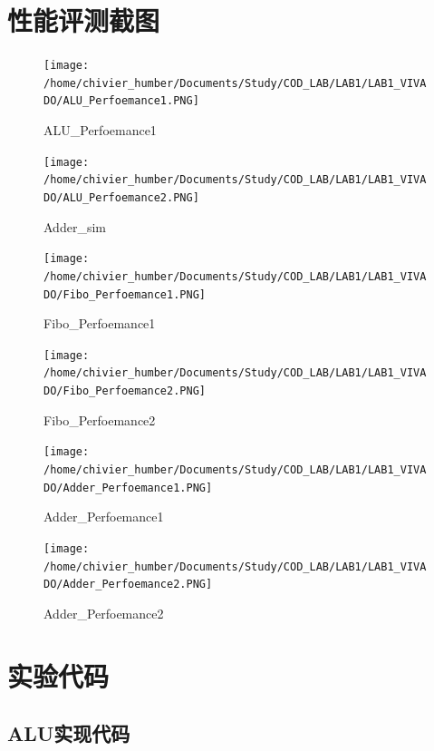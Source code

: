 \documentclass[12pt, a4paper]{article}
\begin{document}
\section{性能评测截图}
\begin{figure}[H]
	\centering
	\texttt{[image: /home/chivier\_humber/Documents/Study/COD\_LAB/LAB1/LAB1\_VIVADO/ALU\_Perfoemance1.PNG]}
	\caption{ALU\_Perfoemance1}
	\label{fig:lab1alusim}
\end{figure}
\begin{figure}[H]
	\centering
	\texttt{[image: /home/chivier\_humber/Documents/Study/COD\_LAB/LAB1/LAB1\_VIVADO/ALU\_Perfoemance2.PNG]}
	\caption{Adder\_sim}
	\label{fig:lab1alusim}
\end{figure}
\begin{figure}[H]
	\centering
	\texttt{[image: /home/chivier\_humber/Documents/Study/COD\_LAB/LAB1/LAB1\_VIVADO/Fibo\_Perfoemance1.PNG]}
	\caption{Fibo\_Perfoemance1}
	\label{fig:lab1alusim}
\end{figure}
\begin{figure}[H]
	\centering
	\texttt{[image: /home/chivier\_humber/Documents/Study/COD\_LAB/LAB1/LAB1\_VIVADO/Fibo\_Perfoemance2.PNG]}
	\caption{Fibo\_Perfoemance2}
	\label{fig:lab1alusim}
\end{figure}
\begin{figure}[H]
	\centering
	\texttt{[image: /home/chivier\_humber/Documents/Study/COD\_LAB/LAB1/LAB1\_VIVADO/Adder\_Perfoemance1.PNG]}
	\caption{Adder\_Perfoemance1}
	\label{fig:lab1alusim}
\end{figure}
\begin{figure}[H]
	\centering
	\texttt{[image: /home/chivier\_humber/Documents/Study/COD\_LAB/LAB1/LAB1\_VIVADO/Adder\_Perfoemance2.PNG]}
	\caption{Adder\_Perfoemance2}
	\label{fig:lab1alusim}
\end{figure}


\section{实验代码}
\subsection{ALU实现代码}



\clearpage
\end{document}

